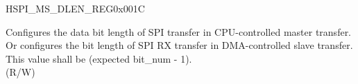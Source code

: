 \begin{register}{H}{SPI\_MS\_DLEN\_REG}{0x001C}\label{regdesc:SPI3MSDLENREG}
%
%
\regnewline%
\begin{regdesc}\begin{reglist}
\label{fielddesc:SPI3MSDATABITLEN}\item [SPI\_MS\_DATA\_BITLEN] Configures the data bit length of SPI transfer in CPU-controlled master transfer. Or configures the bit length of SPI RX transfer in DMA-controlled slave transfer.\\
This value shall be (expected bit\_num - 1). \\
(R/W)
\end{reglist}\end{regdesc}
\end{register}


